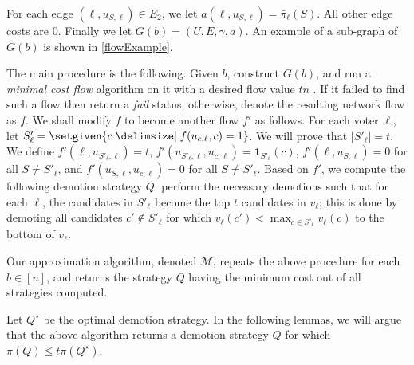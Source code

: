 \documentclass[letterpaper]{article} %
\newcommand{\indic}{\mathbf{1}}
\newcommand{\CMCF}{\emph{minimal cost flow}}
\newcommand{\abs}[1]{\lvert{#1}\rvert}
\begin{document}
For each edge $(\ell, u_{S,\ell}) \in E_2$, we let $a(\ell, u_{S,\ell}) = \bar{\pi}_{\ell}(S)$. All other edge costs are $0$. Finally we let $G(b)=(U,E,\gamma,a)$. An example of a sub-graph of $G(b)$ is shown in \cref{flowExample}.


The main procedure is the following. Given $b$, construct $G(b)$, and run a \CMCF{} algorithm on it with a desired flow value $tn$ \cite{edmonds1972theoretical}. If it failed to find such a flow then return a \emph{fail} status; otherwise, denote the resulting network flow as $f$. We shall modify $f$ to become another flow $f'$ as follows.
For each voter $\ell$, let $S'_{\ell} = \setgiven{c \given f(u_{c,\ell},c)=1}$. We will prove that $\abs{S'_{\ell}}=t$. We define $f'(\ell, u_{S'_{\ell},\ell})=t$, $f'(u_{S'_{\ell},\ell}, u_{c,\ell})=\indic_{S'_{\ell}}(c)$, $f'(\ell,u_{S,\ell})=0$ for all $S \neq S'_{\ell}$, and $f'(u_{S,\ell}, u_{c,\ell})=0$ for all $S \neq S'_{\ell}$.
Based on $f'$, we compute the following demotion strategy $Q$:  perform the necessary demotions such that for each $\ell$, the candidates in $S'_{\ell}$ become the top $t$ candidates in $v_\ell$; this is done by demoting all candidates $c' \notin S'_{\ell}$ for which $v_\ell(c') < \max_{c \in S'_{\ell}} v_\ell(c)$ to the bottom of $v_\ell$.

Our approximation algorithm, denoted $\mathcal{M}$, repeats the above procedure for each $b \in [n]$, and returns the strategy $Q$ having the minimum cost out of all strategies computed.

Let $Q^{\star}$ be the optimal demotion strategy. In the following lemmas, we will argue that the above algorithm returns a demotion strategy $Q$ for which $\pi(Q) \leq t\pi(Q^{\star})$.
\end{document}
